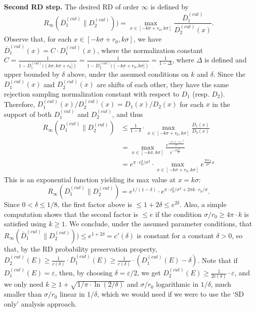 \textbf{Second RD step.} The desired RD of order $\infty$ is defined by
\[
  R_\infty(\overline{D}_1^{(cut)}\|D_2^{(cut)})) = \max_{x \in
    [-k\sigma+r_0,k\sigma]} \frac{\overline{D}_1^{(cut)}} {D_2^{(cut)}(x)}.
\]
Observe that, for each $x \in [-k\sigma+r_0,k\sigma]$, we have
$\overline{D}_1^{(cut)}(x) = C \cdot D_1^{(cut)}(x)$, where the normalization
constant
$C = \frac{1}{1-D_1^{(cut)}((k\sigma,k\sigma+r_0])} =
\frac{1}{1-D_2^{(cut)}((-k\sigma+r_0,k\sigma])} = \frac{1}{1-\Delta}$, where
$\Delta$ is defined and upper bounded by $\delta$ above, under the assumed
conditions on $k$ and $\delta$. Since the $D_1^{(cut)}(x)$ and $D_2^{(cut)}(x)$
are shifts of each other, they have the same rejection sampling normalization
constant with respect to $D_1$ (resp. $D_2$). Therefore,
$D_1^{(cut)}(x)/D_2^{(cut)}(x)=D_1(x)/D_2(x)$ for each $x$ in the support of
both $D_1^{(cut)}$ and $D_2^{(cut)}$, and thus
\begin{align*}
  R_\infty(\overline{D}_1^{(cut)}\|D_2^{(cut)}) &\leq \frac{1}{1-\delta} \cdot \max_{x \in [-k\sigma+r_0,k\sigma]} \frac{D_1(x)}
                                                  {D_2(x)}\\
                                                &= \max_{x \in [-k\sigma,k\sigma]}\frac{e^{\frac{-\pi(x-r_0)^2}{\sigma^2}}}{e^{-\pi\frac{x^2}{\sigma^2}}}
  \\
                                                &= e^{\pi \cdot r_0^2/\sigma^2} \cdot \max_{x \in [-k\sigma+r_0,k\sigma]}e^{\frac{2\pi r_0}
                                                  {\sigma^2}x}
\end{align*}
This is an exponential function yielding its max value at $x = k\sigma$:
$$
R_\infty(\overline{D}_1^{(cut)}\|D_2^{(cut)}) = e^{1/(1-\delta)} \cdot e^{\pi
  \cdot r_0^2/\sigma^2 + 2\pi k \cdot r_0/\sigma}.
$$
Since $0<\delta \leq 1/8$, the first factor above is
$\leq 1+2\delta \leq e^{2\delta}$. Also, a simple computation shows that the
second factor is $\leq e$ if the condition $\sigma/r_0 \geq 4 \pi \cdot k$ is
satisfied using $k \geq 1$. We conclude, under the assumed parameter conditions,
that
$R_\infty(\overline{D}_1^{(cut)}\|D_2^{(cut)})) \leq e^{1+2\delta} = c'(\delta)$
is constant for a constant $\delta>0$, so that, by the RD probability preservation
property,
$D_2^{(cut)}(E) \geq \frac{1}{c(\delta)} \cdot \overline{D}_1^{(cut)}(E) \geq
\frac{1}{c(\delta)} \cdot (D_1^{(cut)}(E) - \delta)$. Note that if
$D_1^{(cut)}(E)=\varepsilon$, then, by choosing $\delta = \varepsilon/2$, we get
$D_2^{(cut)}(E) \geq \frac{1}{2c(\delta)} \cdot \varepsilon$, and we only need
$k \geq 1 + \sqrt{1/\pi \cdot \ln(2/\delta)}$ and $\sigma/r_0$ logarithmic in
$1/\delta$, much smaller than $\sigma/r_0$ linear in $1/\delta$, which we would
need if we were to use the `SD only' analysis approach.

